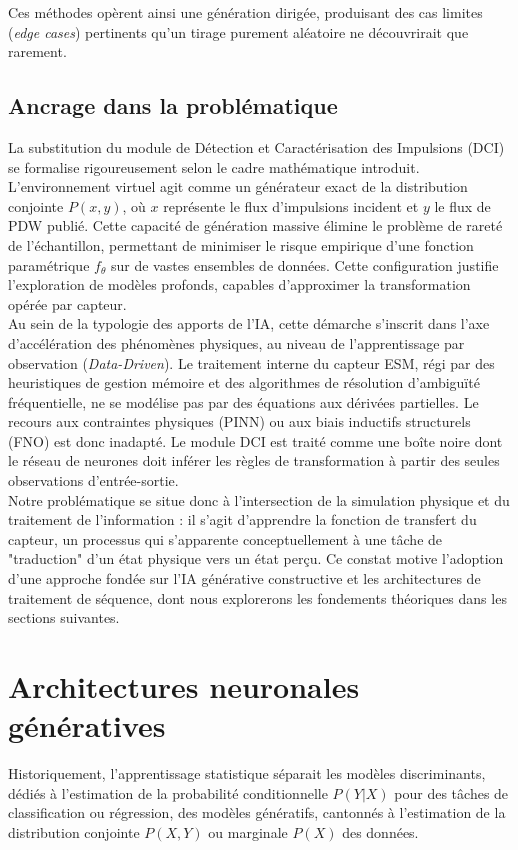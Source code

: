 Ces méthodes opèrent ainsi une génération dirigée, produisant des cas limites (\textit{edge cases}) pertinents qu'un tirage purement aléatoire ne découvrirait que rarement.

\subsection{Ancrage dans la problématique}
La substitution du module de Détection et Caractérisation des Impulsions (DCI) se formalise rigoureusement selon le cadre mathématique introduit. L'environnement virtuel agit comme un générateur exact de la distribution conjointe $P(x,y)$, où $x$ représente le flux d'impulsions incident et $y$ le flux de PDW publié. Cette capacité de génération massive élimine le problème de rareté de l'échantillon, permettant de minimiser le risque empirique d'une fonction paramétrique $f_{\theta}$ sur de vastes ensembles de données. Cette configuration justifie l'exploration de modèles profonds, capables d'approximer la transformation opérée par capteur.\\

Au sein de la typologie des apports de l'IA, cette démarche s'inscrit dans l'axe d'accélération des phénomènes physiques, au niveau de l'apprentissage par observation (\textit{Data-Driven}). Le traitement interne du capteur ESM, régi par des heuristiques de gestion mémoire et des algorithmes de résolution d'ambiguïté fréquentielle, ne se modélise pas par des équations aux dérivées partielles. Le recours aux contraintes physiques (PINN) ou aux biais inductifs structurels (FNO) est donc inadapté. Le module DCI est traité comme une boîte noire dont le réseau de neurones doit inférer les règles de transformation à partir des seules observations d'entrée-sortie.\\

Notre problématique se situe donc à l'intersection de la simulation physique et du traitement de l'information : il s'agit d'apprendre la fonction de transfert du capteur, un processus qui s'apparente conceptuellement à une tâche de "traduction" d'un état physique vers un état perçu. Ce constat motive l'adoption d'une approche fondée sur l'IA générative constructive et les architectures de traitement de séquence, dont nous explorerons les fondements théoriques dans les sections suivantes.

\section{Architectures neuronales génératives}Historiquement, l'apprentissage statistique séparait les modèles discriminants, dédiés à l'estimation de la probabilité conditionnelle $P(Y|X)$ pour des tâches de classification ou régression, des modèles génératifs, cantonnés à l'estimation de la distribution conjointe $P(X,Y)$ ou marginale $P(X)$ des données.\\

